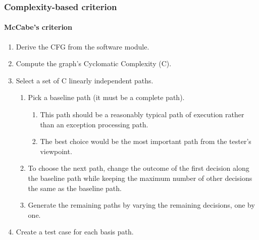 \begin{frame}[hasnext=false,hasprev=true]
\label{procedure:mccabe-criterion}
\frametitle{Complexity-based criterion}
\framesubtitle{McCabe's criterion}

\begin{block:procedure}{}
\begin{enumerate}
	\item Derive the CFG from the software module.
	\item Compute the graph's Cyclomatic Complexity (C).
	\item Select a set of C linearly independent paths.
	\begin{enumerate}
		\item Pick a baseline path (it must be a complete path).
		\begin{enumerate}
			\item This path should be a reasonably typical path of execution
			rather than an exception processing path.

			\item The best choice would be the most important path from the
			tester's viewpoint.
		\end{enumerate}

		\item To choose the next path, change the outcome of the first decision
		along the baseline path while keeping the maximum number of other
		decisions the same as the baseline path.

		\item Generate the remaining paths by varying the remaining decisions,
		one by one.
	\end{enumerate}
	\item Create a test case for each basis path.
\end{enumerate}
\end{block:procedure}


\hfill
\hyperlink{example:mccabe}{}
\end{frame}
